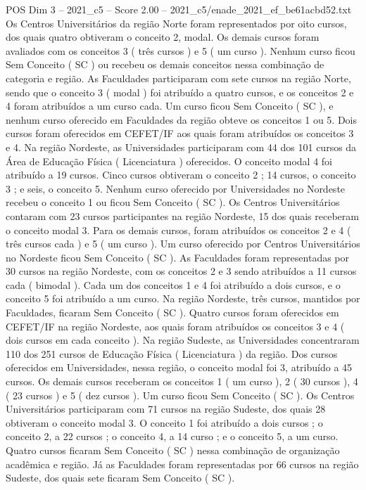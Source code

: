 \begin{textsample}{POS Dim 3 – 2021\_c5 – Score 2.00 – 2021\_c5/enade\_2021\_ef\_be61acbd52.txt}
Os Centros Universitários da região Norte foram representados por oito cursos, dos quais quatro obtiveram o conceito 2, modal.
Os demais cursos foram avaliados com os conceitos 3 ( três cursos ) e 5 ( um curso ).
Nenhum curso ficou Sem Conceito ( SC ) ou recebeu os demais conceitos nessa combinação de categoria e região.
As Faculdades participaram com sete cursos na região Norte, sendo que o conceito 3 ( modal ) foi atribuído a quatro cursos, e os conceitos 2 e 4 foram atribuídos a um curso cada.
Um curso ficou Sem Conceito ( SC ), e nenhum curso oferecido em Faculdades da região obteve os conceitos 1 ou 5.
Dois cursos foram oferecidos em CEFET/IF aos quais foram atribuídos os conceitos 3 e 4.
Na região Nordeste, as Universidades participaram com 44 dos 101 cursos da Área de Educação Física ( Licenciatura ) oferecidos.
O conceito modal 4 foi atribuído a 19 cursos.
Cinco cursos obtiveram o conceito 2 ; 14 cursos, o conceito 3 ; e seis, o conceito 5.
Nenhum curso oferecido por Universidades no Nordeste recebeu o conceito 1 ou ficou Sem Conceito ( SC ).
Os Centros Universitários contaram com 23 cursos participantes na região Nordeste, 15 dos quais receberam o conceito modal 3.
Para os demais cursos, foram atribuídos os conceitos 2 e 4 ( três cursos cada ) e 5 ( um curso ).
Um curso oferecido por Centros Universitários no Nordeste ficou Sem Conceito ( SC ).
As Faculdades foram representadas por 30 cursos na região Nordeste, com os conceitos 2 e 3 sendo atribuídos a 11 cursos cada ( bimodal ).
Cada um dos conceitos 1 e 4 foi atribuído a dois cursos, e o conceito 5 foi atribuído a um curso.
Na região Nordeste, três cursos, mantidos por Faculdades, ficaram Sem Conceito ( SC ).
Quatro cursos foram oferecidos em CEFET/IF na região Nordeste, aos quais foram atribuídos os conceitos 3 e 4 ( dois cursos em cada conceito ).
Na região Sudeste, as Universidades concentraram 110 dos 251 cursos de Educação Física ( Licenciatura ) da região.
Dos cursos oferecidos em Universidades, nessa região, o conceito modal foi 3, atribuído a 45 cursos.
Os demais cursos receberam os conceitos 1 ( um curso ), 2 ( 30 cursos ), 4 ( 23 cursos ) e 5 ( dez cursos ).
Um curso ficou Sem Conceito ( SC ).
Os Centros Universitários participaram com 71 cursos na região Sudeste, dos quais 28 obtiveram o conceito modal 3.
O conceito 1 foi atribuído a dois cursos ; o conceito 2, a 22 cursos ; o conceito 4, a 14 curso ; e o conceito 5, a um curso.
Quatro cursos ficaram Sem Conceito ( SC ) nessa combinação de organização acadêmica e região.
Já as Faculdades foram representadas por 66 cursos na região Sudeste, dos quais sete ficaram Sem Conceito ( SC ).

\end{textsample}
